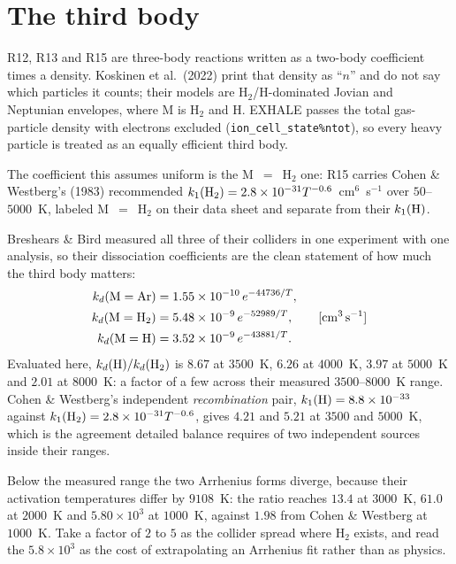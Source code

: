 \documentclass[english,a4paper]{my_memo}
\begin{document}
\section{The third body}

R12, R13 and R15 are three-body reactions written as a two-body coefficient
times a density. Koskinen et al.\ (2022) print that density as ``$n$'' and do
not say which particles it counts; their models are H$_2$/H-dominated Jovian
and Neptunian envelopes, where M is H$_2$ and H. EXHALE passes the total
gas-particle density with electrons excluded
(\texttt{ion\_cell\_state\%ntot}), so every heavy particle is treated as an
equally efficient third body.

The coefficient this assumes uniform is the M~$=$~H$_2$ one: R15 carries
Cohen \& Westberg's (1983) recommended $k_1({\rm H_2}) = 2.8\times10^{-31}
T^{-0.6}$~cm$^6$~s$^{-1}$ over $50$--$5000$~K, labeled M~$=$~H$_2$ on their
data sheet and separate from their $k_1({\rm H})$.

Breshears \& Bird measured all three of their colliders in one experiment with
one analysis, so their dissociation coefficients are the clean statement of
how much the third body matters:
%
\begin{align}
  k_d(\mathrm{M}={\rm Ar}) &= 1.55\times10^{-10}\,e^{-44736/T}, \nonumber\\
  k_d(\mathrm{M}={\rm H_2}) &= 5.48\times10^{-9}\,e^{-52989/T},
  \qquad [\mathrm{cm^3\,s^{-1}}] \\
  k_d(\mathrm{M}={\rm H})  &= 3.52\times10^{-9}\,e^{-43881/T}. \nonumber
\end{align}
%
Evaluated here, $k_d({\rm H})/k_d({\rm H_2})$ is $8.67$ at $3500$~K, $6.26$ at
$4000$~K, $3.97$ at $5000$~K and $2.01$ at $8000$~K: a factor of a few
across their measured $3500$--$8000$~K range. Cohen \& Westberg's independent
\emph{recombination} pair, $k_1({\rm H}) = 8.8\times10^{-33}$ against
$k_1({\rm H_2}) = 2.8\times10^{-31}T^{-0.6}$, gives $4.21$ and $5.21$ at
$3500$ and $5000$~K, which is the agreement detailed balance requires of two
independent sources inside their ranges.

Below the measured range the two Arrhenius forms diverge, because their
activation temperatures differ by $9108$~K: the ratio reaches $13.4$ at
$3000$~K, $61.0$ at $2000$~K and $5.80\times10^{3}$ at $1000$~K, against
$1.98$ from Cohen \& Westberg at $1000$~K. Take a factor of $2$ to $5$ as the
collider spread where H$_2$ exists, and read the $5.8\times10^{3}$ as the
cost of extrapolating an Arrhenius fit rather than as physics.
\end{document}
